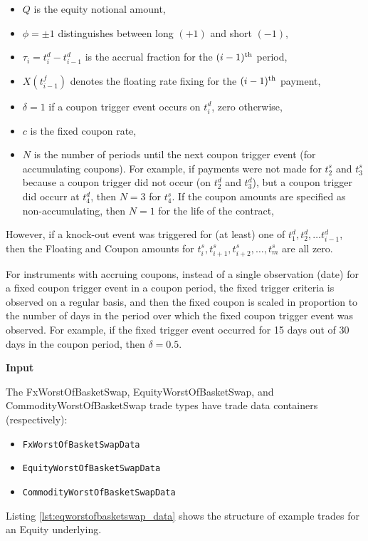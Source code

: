 {\begin{itemize}
  \item $Q$ is the equity notional amount,
  \item $\phi = \pm 1$ distinguishes between long $(+1)$ and short $(-1)$,
  \item $\tau_i = t^d_{i} - t^d_{i-1}$ is the accrual fraction for the $(i-1)^{\rm th}$ period,
  \item $X(t_{i-1}^f)$ denotes the floating rate fixing for the $(i-1)^{\rm th}$ payment,
  \item $\delta = 1$ if a coupon trigger event occurs on $t^d_i$, zero otherwise,
  \item $c$ is the fixed coupon rate,
  \item $N$ is the number of periods until the next coupon trigger event
  (for accumulating coupons). For example, if payments were not made for $t_2^s$ and
  $t_3^s$ because a coupon trigger did not occur (on $t^d_2$ and $t^d_3$), but a coupon trigger did occurr at
  $t_4^d$, then $N = 3$ for $t_4^s$. If the coupon amounts are specified as non-accumulating, then $N=1$
  for the life of the contract,
\end{itemize}

However, if a knock-out event was triggered for (at least) one of $t_1^d, t_2^d, \ldots
t_{i-1}^d$, then the Floating and Coupon amounts for $t_i^s, t_{i+1}^s, t_{i+2}^s, \ldots, t_m^s$ are all zero.

For instruments with accruing coupons, instead of a single observation (date) for 
a fixed coupon trigger event in a coupon period, the fixed trigger criteria is observed
on a regular basis, and then the fixed coupon is scaled in proportion to the number of
days in the period over which the fixed coupon trigger event was observed. For example, if
the fixed trigger event occurred for 15 days out of 30 days in the coupon period, then
$\delta = 0.5$.

{\bf Input}}\fi

The FxWorstOfBasketSwap, EquityWorstOfBasketSwap, and CommodityWorstOfBasketSwap trade types
have trade data containers (respectively):
\begin{itemize}
  \item \lstinline!FxWorstOfBasketSwapData!
  \item \lstinline!EquityWorstOfBasketSwapData!
  \item \lstinline!CommodityWorstOfBasketSwapData!
\end{itemize}
Listing \ref{lst:eqworstofbasketswap_data} shows the structure of example trades for an Equity underlying.

